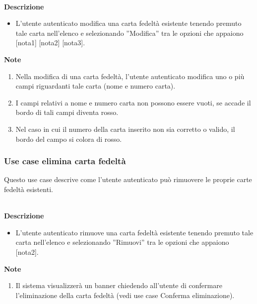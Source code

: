 \documentclass[a4paper,12pt]{article}
\begin{document}
\textbf{\\Descrizione}
\begin{itemize} \setlength\itemsep{0.01em}
\item L'utente autenticato modifica una carta fedeltà esistente tenendo premuto tale carta nell'elenco e selezionando ''Modifica'' tra le opzioni che appaiono [nota1] [nota2] [nota3].
\end{itemize}

\textbf{Note}
\begin{enumerate} \setlength\itemsep{0.01em}
\item Nella modifica di una carta fedeltà, l'utente autenticato modifica uno o più campi riguardanti tale carta  (nome e numero carta).
\item I campi relativi a nome e numero carta non possono essere vuoti, se accade il bordo di tali campi diventa rosso.
\item Nel caso in cui il numero della carta inserito non sia corretto o valido, il bordo del campo si colora di rosso.
\end{enumerate}



\subsubsection*{Use case elimina carta fedeltà}

 Questo use case descrive come l'utente autenticato può rimuovere le proprie carte fedeltà esistenti.
 
\textbf{\\Descrizione}
\begin{itemize} \setlength\itemsep{0.01em}
\item L'utente autenticato rimuove una carta fedeltà esistente tenendo premuto tale carta nell'elenco e selezionando ''Rimuovi'' tra le opzioni che appaiono [nota2].
\end{itemize}

\textbf{Note}
\begin{enumerate} \setlength\itemsep{0.01em}
\item Il sistema visualizzerà un banner chiedendo all'utente di confermare l'eliminazione della carta fedeltà  (vedi use case Conferma eliminazione).
\end{enumerate}



\vspace{1cm}
\end{document}
